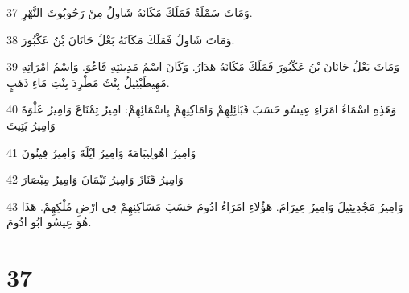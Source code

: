 \par 37 وَمَاتَ سَمْلَةُ فَمَلَكَ مَكَانَهُ شَاولُ مِنْ رَحُوبُوتَ النَّهْرِ.
\par 38 وَمَاتَ شَاولُ فَمَلَكَ مَكَانَهُ بَعْلُ حَانَانَ بْنُ عَكْبُورَ.
\par 39 وَمَاتَ بَعْلُ حَانَانَ بْنُ عَكْبُورَ فَمَلَكَ مَكَانَهُ هَدَارُ. وَكَانَ اسْمُ مَدِينَتِهِ فَاعُوَ. وَاسْمُ امْرَاتِهِ مَهِيطَبْئِيلُ بِنْتُ مَطْرِدَ بِنْتِ مَاءِ ذَهَبٍ.
\par 40 وَهَذِهِ اسْمَاءُ امَرَاءِ عِيسُو حَسَبَ قَبَائِلِهِمْ وَامَاكِنِهِمْ بِاسْمَائِهِمْ: امِيرُ تِمْنَاعَ وَامِيرُ عَلْوَةَ وَامِيرُ يَتِيتَ
\par 41 وَامِيرُ اهُولِيبَامَةَ وَامِيرُ ايْلَةَ وَامِيرُ فِينُونَ
\par 42 وَامِيرُ قَنَازَ وَامِيرُ تَيْمَانَ وَامِيرُ مِبْصَارَ
\par 43 وَامِيرُ مَجْدِيئِيلَ وَامِيرُ عِيرَامَ. هَؤُلاءِ امَرَاءُ ادُومَ حَسَبَ مَسَاكِنِهِمْ فِي ارْضِ مُلْكِهِمْ. هَذَا هُوَ عِيسُو ابُو ادُومَ.

\chapter{37}

